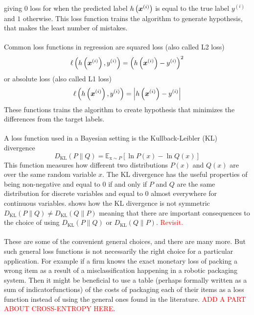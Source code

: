 giving $0$ loss for when the predicted label $h\left (\boldsymbol{x}^{(i)}\right)$ is equal to the true label $y^{(i)}$ and $1$ otherwise. This loss function trains the algorithm to generate hypothesis, that makes the least number of mistakes. \\
\\
Common loss functions in regression are squared loss (also called L2 loss)
\begin{equation} \label{eq:mse}
    \ell\left(h\left (\boldsymbol{x}^{(i)}\right), y^{(i)} \right) = \left ( h\left (\boldsymbol{x}^{(i)}\right) - y^{(i)} \right)^2
\end{equation}
or absolute loss (also called L1 loss)
$$ \ell\left(h\left (\boldsymbol{x}^{(i)}\right), y^{(i)}\right) = \left |h\left (\boldsymbol{x}^{(i)}\right) - y^{(i)}\right|$$
These functions trains the algorithm to create hypothesis that minimizes the differences from the target labels. \\
\\
A loss function used in a Bayesian setting is the Kullback-Leibler (KL) divergence
\begin{equation}\label{eq: KL}
    D_{\mathrm{KL}}(P \| Q)=\mathbb{E}_{\mathrm{x} \sim P}[\ln P(x)-\ln Q(x)]
\end{equation}
This function measures how different two distributions $P(x)$ and $Q(x)$ are over the same random variable $x$. The KL divergence has the useful properties of being non-negative and equal to $0$ if and only if $P$ and $Q$ are the same distribution for discrete variables and equal to $0$ almost everywhere for continuous variables. \cite{Goodfellow-et-al-2016} shows how the KL divergence is not symmetric $D_{\text{KL}}(P \| Q) \neq D_{\text{KL}}(Q \| P)$ meaning that there are important consequences to the choice of using $D_{\text{KL}}(P \| Q)$ or $D_{\text{KL}}(Q \| P)$. \textcolor{red}{Revisit.}
\\
\\
These are some of the convenient general choices, and there are many more. But such general loss functions is not necessarily the right choice for a particular application. For example if a firm knows the exact monetary loss of packing a wrong item as a result of a misclassification happening in a robotic packaging system. Then it might be beneficial to use a table (perhaps formally written as a sum of indicatorfunctions) of the costs of packaging each of their items as a loss function instead of using the general ones found in the literature.
\textcolor{red}{ADD A PART ABOUT CROSS-ENTROPY HERE}.
